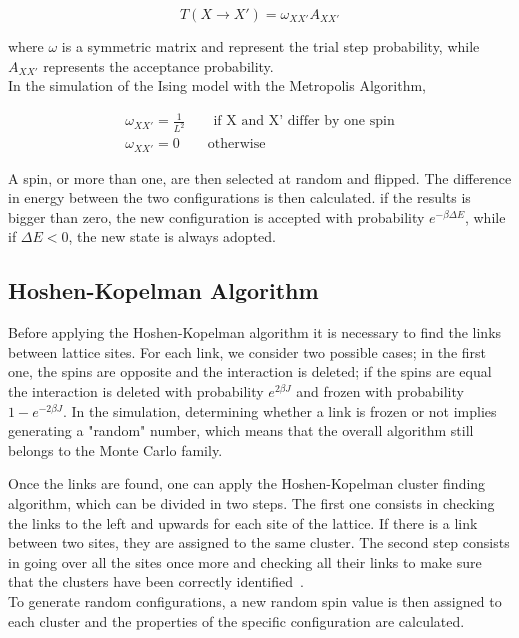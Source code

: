 \documentclass[twoside]{article}
\begin{document}
\begin{multicols}{2}
\begin{equation}
T(X \rightarrow X') = \omega_{XX'}A_{XX'}
\end{equation}

where \textbf{$\omega$} is a symmetric matrix and represent the trial step probability, while $A_{XX'}$ represents the acceptance probability. \\
In the simulation of the Ising model with the Metropolis Algorithm, 

\begin{align}
\omega_{XX'} = \frac{1}{L^2} \qquad \text{if X and X' differ by one spin} \\
\omega_{XX'} = 0 \qquad  \text{otherwise} 
\end{align}

A spin, or more than one, are then selected at random and flipped. The difference in energy between the two configurations is then calculated. if the results is bigger than zero, the new configuration is accepted with probability $e^{-\beta\Delta E}$, while if $\Delta E < 0$, the new state is always adopted.

\subsection{Hoshen-Kopelman Algorithm} \label{hk_al}
Before applying the Hoshen-Kopelman algorithm it is necessary to find the links between lattice sites. For each link, we consider two possible cases; in the first one, the spins are opposite and the interaction is deleted; if the spins are equal the interaction is deleted with probability $e^{2\beta J}$ and frozen with probability $1-e^{-2\beta J}$.
In the simulation, determining whether a link is frozen or not implies generating a "random" number, which means that the overall algorithm still belongs to the Monte Carlo family. 

Once the links are found, one can apply the Hoshen-Kopelman cluster finding algorithm, which can be divided in two steps.
The first one consists in checking the links to the left and upwards for each site of the lattice. If there is a link between two sites, they are assigned to the same cluster. The second step consists in going over all the sites once more and checking all their links to make sure that the clusters have been correctly identified~\cite{joas}. \\ To generate random configurations, a new random spin value is then assigned to each cluster and the properties of the specific configuration are calculated.


\end{multicols}
\end{document}
